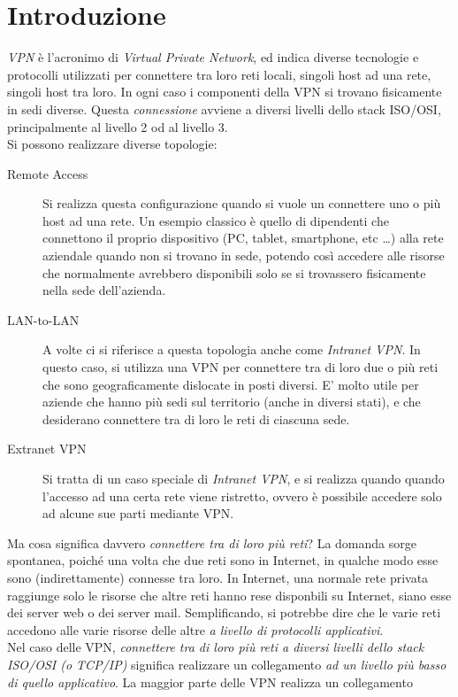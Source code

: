 \section{Introduzione}
\textit{VPN} è l'acronimo di \textit{Virtual Private Network}, ed indica diverse
tecnologie e protocolli utilizzati per connettere tra loro
reti locali, singoli host
ad una rete, singoli host tra loro. In ogni caso i componenti della VPN si trovano
fisicamente in sedi diverse. Questa \textit{connessione} avviene a diversi livelli dello stack
ISO/OSI, principalmente al livello 2 od al livello 3.\\
Si possono realizzare diverse topologie:
\begin{description}
	\item[Remote Access]Si realizza questa configurazione quando si vuole un connettere
	uno o più host ad una rete. Un esempio classico è quello di dipendenti che connettono
	il proprio dispositivo (PC, tablet, smartphone, etc \ldots) alla rete aziendale
	quando non si trovano in sede, potendo così accedere alle risorse che normalmente
	avrebbero disponibili solo se si trovassero fisicamente nella sede dell'azienda.
	\item[LAN-to-LAN]A volte ci si riferisce a questa topologia anche come \textit{Intranet
	VPN}. In questo caso, si utilizza una VPN per connettere tra di loro due o più
	reti che sono geograficamente dislocate in posti diversi. E' molto utile per aziende
	che hanno più sedi sul territorio (anche in diversi stati), e che desiderano connettere
	tra di loro le reti di ciascuna sede.
	\item[Extranet VPN]Si tratta di un caso speciale di \textit{Intranet VPN}, e si realizza
	quando quando l'accesso ad una certa rete viene ristretto, ovvero è possibile accedere
	solo ad alcune sue parti mediante VPN.
\end{description}
Ma cosa significa davvero \textit{connettere tra di loro più reti}? La domanda sorge
spontanea, poiché una volta che due reti sono in Internet, in qualche modo
esse sono (indirettamente) connesse tra loro. In Internet, una normale rete privata
raggiunge solo le risorse che altre reti hanno rese disponbili su Internet,
siano esse dei server web o dei server mail.
Semplificando, si potrebbe dire che le varie reti accedono alle varie risorse delle
altre \textit{a livello di protocolli applicativi}.\\
Nel caso delle VPN, \textit{connettere tra di loro più reti a diversi livelli dello
	stack ISO/OSI (o TCP/IP)} significa realizzare un collegamento \textit{ad un livello
più basso di quello applicativo}. La maggior parte delle VPN realizza un collegamento
